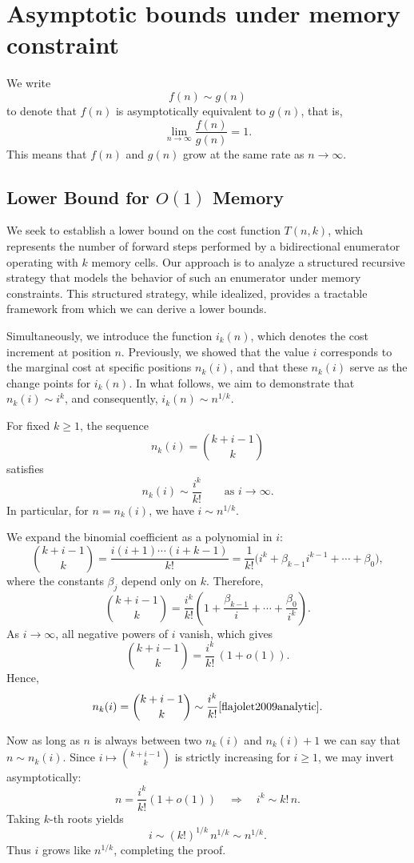 \documentclass[a4paper,10pt]{article}
\begin{document}
\section{Asymptotic bounds under memory constraint}

We write
\[
f(n) \sim g(n)
\]
to denote that \( f(n) \) is asymptotically equivalent to \( g(n) \), that is,
\[
\lim_{n \to \infty} \frac{f(n)}{g(n)} = 1.
\]
This means that \( f(n) \) and \( g(n) \) grow at the same rate as \( n \to \infty \).


\subsection{Lower Bound for \( O(1) \) Memory}

We seek to establish a lower bound on the cost function \( T(n, k) \), which represents the number of forward steps performed by a bidirectional enumerator operating with \( k \) memory cells. Our approach is to analyze a structured recursive strategy that models the behavior of such an enumerator under memory constraints. This structured strategy, while idealized, provides a tractable framework from which we can derive a lower bounds.

Simultaneously, we introduce the function \( i_k(n) \), which denotes the cost increment at position \( n \). Previously, we showed that the value \( i \) corresponds to the marginal cost at specific positions \( n_k(i) \), and that these \( n_k(i) \) serve as the change points for \( i_k(n) \). In what follows, we aim to demonstrate that \( n_k(i) \sim i^k \), and consequently, \( i_k(n) \sim n^{1/k} \).

For fixed \(k \ge 1\), the sequence
\[
n_k(i) = \binom{k+i-1}{k}
\]
satisfies
\[
n_k(i) \sim \frac{i^k}{k!} \qquad \text{as } i \to \infty.
\]
In particular, for \(n = n_k(i)\), we have \(i \sim n^{1/k}\).

We expand the binomial coefficient as a polynomial in \(i\):
\[
\binom{k+i-1}{k}
= \frac{i(i+1)\cdots(i+k-1)}{k!}
= \frac{1}{k!}\bigl(i^k + \beta_{k-1} i^{k-1} + \cdots + \beta_0\bigr),
\]
where the constants \(\beta_j\) depend only on \(k\). Therefore,
\[
\binom{k+i-1}{k}
= \frac{i^k}{k!}\left(1 + \frac{\beta_{k-1}}{i} + \cdots + \frac{\beta_0}{i^k}\right).
\]
As \(i \to \infty\), all negative powers of \(i\) vanish, which gives
\[
\binom{k+i-1}{k} = \frac{i^k}{k!}\,(1 + o(1)).
\]
Hence,
\[
n_k(i) = \binom{k+i-1}{k} \sim \frac{i^k}{k!} \cite{flajolet2009analytic}.
\]

Now as long as $n$ is always between two $n_k(i)$ and $n_k(i)+1$ we can say that \(n \sim n_k(i)\). Since \(i \mapsto \binom{k+i-1}{k}\) is strictly increasing for \(i \ge 1\), we may invert asymptotically:
\[
n = \frac{i^k}{k!}(1+o(1))
\quad\Longrightarrow\quad
i^k \sim k! \, n.
\]
Taking \(k\)-th roots yields
\[
i \sim (k!)^{1/k}\,n^{1/k} \sim n^{1/k}.
\]
Thus \(i\) grows like \(n^{1/k}\), completing the proof.
\end{document}
